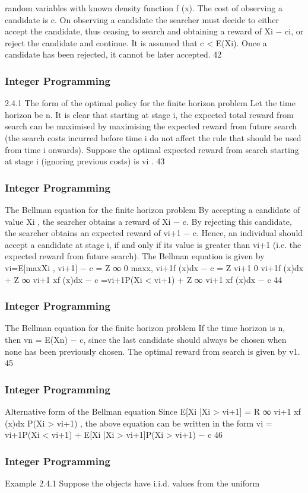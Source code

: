 \begin{frame}
random variables with known density function f (x).
The cost of observing a candidate is c. On observing a candidate
the searcher must decide to either accept the candidate, thus
ceasing to search and obtaining a reward of Xi − ci, or reject the
candidate and continue. It is assumed that c < E(Xi).
Once a candidate has been rejected, it cannot be later accepted.
42 \end{frame}  \begin{frame} \frametitle{Integer Programming}     
2.4.1 The form of the optimal policy for the finite horizon
problem
Let the time horizon be n.
It is clear that starting at stage i, the expected total reward from
search can be maximised by maximising the expected reward from
future search (the search costs incurred before time i do not affect
the rule that should be used from time i onwards).
Suppose the optimal expected reward from search starting at stage
i (ignoring previous costs) is vi
.
43 \end{frame}  \begin{frame} \frametitle{Integer Programming}     
The Bellman equation for the finite horizon problem
By accepting a candidate of value Xi
, the searcher obtains a
reward of Xi − c. By rejecting this candidate, the searcher obtains
an expected reward of vi+1 − c.
Hence, an individual should accept a candidate at stage i, if and
only if its value is greater than vi+1 (i.e. the expected reward from
future search).
The Bellman equation is given by
vi=E[max{Xi
, vi+1}] − c =
Z ∞
0
max{x, vi+1}f (x)dx − c
=
Z vi+1
0
vi+1f (x)dx +
Z ∞
vi+1
xf (x)dx − c
=vi+1P(Xi < vi+1) + Z ∞
vi+1
xf (x)dx − c
44 \end{frame}  \begin{frame} \frametitle{Integer Programming}     
The Bellman equation for the finite horizon problem
If the time horizon is n, then vn = E(Xn) − c, since the last
candidate should always be chosen when none has been previously
chosen.
The optimal reward from search is given by v1.
45 \end{frame}  \begin{frame} \frametitle{Integer Programming}     
Alternative form of the Bellman equation
Since
E[Xi
|Xi > vi+1] =
R ∞
vi+1
xf (x)dx
P(Xi > vi+1)
,
the above equation can be written in the form
vi = vi+1P(Xi < vi+1) + E[Xi
|Xi > vi+1]P(Xi > vi+1) − c
46 \end{frame}  \begin{frame} \frametitle{Integer Programming}     
Example 2.4.1
Suppose the objects have i.i.d. values from the uniform

\end{frame}
